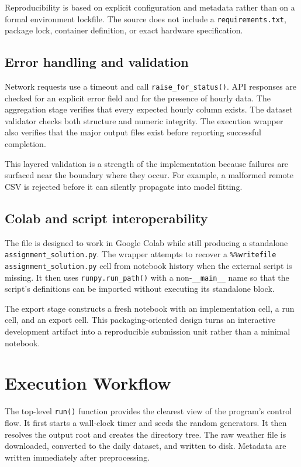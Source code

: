 \documentclass[11pt,a4paper]{article}
\newcommand{\code}[1]{\texttt{#1}}
\begin{document}
Reproducibility is based on explicit configuration and metadata rather than on a formal environment lockfile. The source does not include a \code{requirements.txt}, package lock, container definition, or exact hardware specification.

\subsection{Error handling and validation}
Network requests use a timeout and call \code{raise\_for\_status()}. API responses are checked for an explicit error field and for the presence of hourly data. The aggregation stage verifies that every expected hourly column exists. The dataset validator checks both structure and numeric integrity. The execution wrapper also verifies that the major output files exist before reporting successful completion.

This layered validation is a strength of the implementation because failures are surfaced near the boundary where they occur. For example, a malformed remote CSV is rejected before it can silently propagate into model fitting.

\subsection{Colab and script interoperability}
The file is designed to work in Google Colab while still producing a standalone \code{assignment\_solution.py}. The wrapper attempts to recover a \code{\%\%writefile assignment\_solution.py} cell from notebook history when the external script is missing. It then uses \code{runpy.run\_path()} with a non-\code{\_\_main\_\_} name so that the script's definitions can be imported without executing its standalone block.

The export stage constructs a fresh notebook with an implementation cell, a run cell, and an export cell. This packaging-oriented design turns an interactive development artifact into a reproducible submission unit rather than a minimal notebook.

\section{Execution Workflow}
The top-level \code{run()} function provides the clearest view of the program's control flow. It first starts a wall-clock timer and seeds the random generators. It then resolves the output root and creates the directory tree. The raw weather file is downloaded, converted to the daily dataset, and written to disk. Metadata are written immediately after preprocessing.
\end{document}
